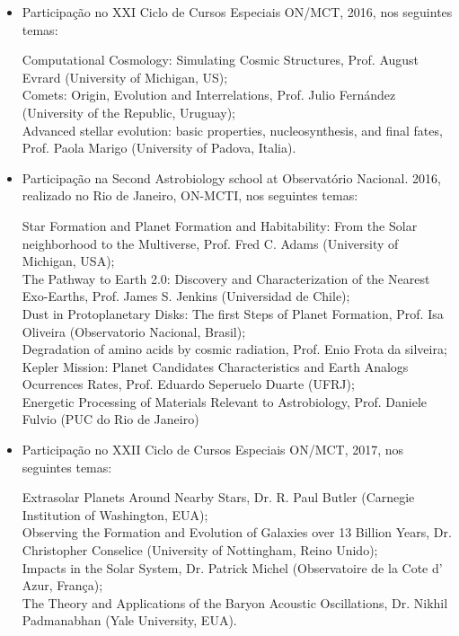 \documentclass[a4paper, 11pt]{article}
\begin{document}
\begin{itemize}
	\item Participação no XXI Ciclo de Cursos Especiais ON/MCT, 2016, nos seguintes temas: 

  Computational Cosmology: Simulating Cosmic Structures, Prof. August Evrard (University of Michigan, US); \\
  Comets: Origin, Evolution and Interrelations, Prof. Julio Fernández (University of the Republic, Uruguay); \\
  Advanced stellar evolution: basic properties, nucleosynthesis, and final fates, Prof. Paola Marigo (University of Padova, Italia).

	\item Participação na Second Astrobiology school at Observatório Nacional. 2016, realizado no Rio de Janeiro, ON-MCTI, nos seguintes temas: 

  Star Formation and Planet Formation and Habitability: From the Solar neighborhood to the Multiverse, Prof. Fred C. Adams (University of Michigan, USA); \\ The Pathway to Earth 2.0: Discovery and Characterization of the Nearest Exo-Earths, Prof. James S. Jenkins (Universidad de Chile); \\
  Dust in Protoplanetary Disks: The first Steps of Planet Formation, Prof. Isa Oliveira (Observatorio Nacional, Brasil); \\
  Degradation of amino acids by cosmic radiation, Prof. Enio Frota da silveira; \\
  Kepler Mission: Planet Candidates Characteristics and Earth Analogs Ocurrences Rates, Prof. Eduardo Seperuelo Duarte (UFRJ); \\
  Energetic Processing of Materials Relevant to Astrobiology, Prof. Daniele Fulvio (PUC do Rio de Janeiro)
	

	\item Participação no XXII Ciclo de Cursos Especiais ON/MCT, 2017, nos seguintes temas: 

  Extrasolar Planets Around Nearby Stars, Dr. R. Paul Butler (Carnegie Institution of Washington, EUA); \\
  Observing the Formation and Evolution of Galaxies over 13 Billion Years, Dr. Christopher Conselice (University of Nottingham, Reino Unido); \\
  Impacts in the Solar System, Dr. Patrick Michel (Observatoire de la Cote d' Azur, França); \\
  The Theory and Applications of the Baryon Acoustic Oscillations, Dr. Nikhil Padmanabhan (Yale University, EUA).
\end{itemize}
\end{document}
